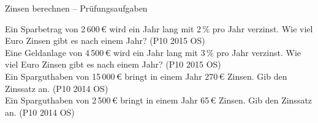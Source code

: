 \setcounter{aufgabe}{14}

\begin{aufgabe}{Zinsen berechnen – Prüfungsaufgaben}
\begin{teile}
\teil Ein Sparbetrag von 2\,600\,€ wird ein Jahr lang mit 2\,\% pro Jahr verzinst. Wie viel Euro Zinsen gibt es nach einem Jahr? \hfill (P10 2015 OS) \\ \leerfeld[€]
\teil Eine Geldanlage von 4\,500\,€ wird ein Jahr lang mit 3\,\% pro Jahr verzinst. Wie viel Euro Zinsen gibt es nach einem Jahr? \hfill (P10 2015 OS) \\ \leerfeld[€]
\teil Ein Sparguthaben von 15\,000\,€ bringt in einem Jahr 270\,€ Zinsen. Gib den Zinssatz an. \hfill (P10 2014 OS) \\ \leerfeld[\%]
\teil Ein Sparguthaben von 2\,500\,€ bringt in einem Jahr 65\,€ Zinsen. Gib den Zinssatz an. \hfill (P10 2014 OS) \\ \leerfeld[\%]
\end{teile}
\end{aufgabe}

